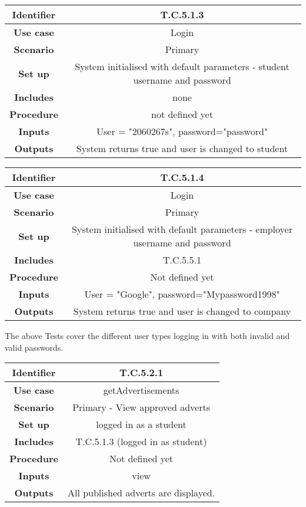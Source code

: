 \begin{tabular}{|c|c|}
\hline \textbf{Identifier} & T.C.5.1.3\\
\hline \textbf{Use case} & Login \\
\hline \textbf{Scenario} & Primary\\
\hline \textbf{Set up} & System initialised with default parameters - student username and password\\
\hline \textbf{Includes} & none\\
\hline \textbf{Procedure} & not defined yet\\
\hline \textbf{Inputs} & User = "2060267s", password="password"\\
\hline \textbf{Outputs} & System returns true and user is changed to student\\
\hline
\end{tabular}

\begin{tabular}{|c|c|}
\hline \textbf{Identifier} & T.C.5.1.4 \\
\hline \textbf{Use case} & Login \\
\hline \textbf{Scenario} & Primary\\
\hline \textbf{Set up} & System initialised with default parameters - employer username and password\\
\hline \textbf{Includes} & T.C.5.5.1\\
\hline \textbf{Procedure} & Not defined yet\\
\hline \textbf{Inputs} & User = "Google", password="Mypassword1998"\\
\hline \textbf{Outputs} & System returns true and user is changed to company\\
\hline
\end{tabular}

The above Tests cover the different user types logging in with both invalid and valid passwords.\\ 

\begin{tabular}{|c|c|}
\hline \textbf{Identifier} & T.C.5.2.1 \\
\hline \textbf{Use case} & getAdvertisements\\
\hline \textbf{Scenario} & Primary - View approved adverts\\
\hline \textbf{Set up} & logged in as a student\\
\hline \textbf{Includes} & T.C.5.1.3 (logged in as student)\\
\hline \textbf{Procedure} & Not defined yet\\
\hline \textbf{Inputs} & view\\
\hline \textbf{Outputs} & All published adverts are displayed.\\
\hline
\end{tabular}

